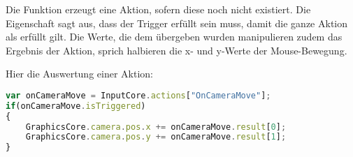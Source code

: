Die Funktion  erzeugt eine Aktion, sofern diese noch nicht existiert. Die Eigenschaft  sagt aus, dass der Trigger erfüllt sein muss, damit die ganze Aktion als erfüllt gilt. Die Werte, die dem  übergeben wurden manipulieren zudem das Ergebnis der Aktion, sprich halbieren die x- und y-Werte der Mouse-Bewegung.

Hier die Auswertung einer Aktion:
\begin{lstlisting}[language=JavaScript]
var onCameraMove = InputCore.actions["OnCameraMove"];
if(onCameraMove.isTriggered)
{
	GraphicsCore.camera.pos.x += onCameraMove.result[0];
	GraphicsCore.camera.pos.y += onCameraMove.result[1];
}
\end{lstlisting}

